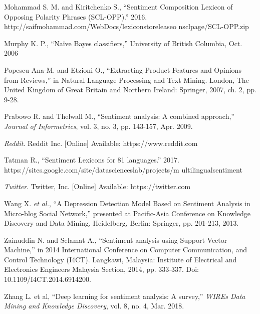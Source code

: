 \documentclass[12pt,journal,compsoc]{IEEEtran}
\begin{document}
\begin{thebibliography}{1}
  \bibitem{}
  Mohammad S. M. and Kiritchenko S., “Sentiment Composition Lexicon of Opposing Polarity Phrases (SCL-OPP).” 2016. http://saifmohammad.com/WebDocs/lexiconstoreleaseo \newline nsclpage/SCL-OPP.zip

  \bibitem{}
  Murphy K. P., “Naïve Bayes classifiers,” University of British Columbia, Oct. 2006

  \bibitem{}
  Popescu Ana-M. and Etzioni O., “Extracting Product Features and Opinions from Reviews,” in Natural Language Processing and Text Mining. London, The United Kingdom of Great Britain and Northern Ireland: Springer, 2007, ch. 2, pp. 9-28.

  \bibitem{}
  Prabowo R. and Thelwall M., “Sentiment analysis: A combined approach,” \emph{Journal of Informetrics}, vol. 3, no. 3, pp. 143-157, Apr. 2009.

  \bibitem{}
  \emph{Reddit}. Reddit Inc. [Online] Available: https://www.reddit.com

  \bibitem{}
  Tatman R., “Sentiment Lexicons for 81 languages.” 2017. https://sites.google.com/site/datascienceslab/projects/m \newline ultilingualsentiment

  \bibitem{}
  \emph{Twitter}. Twitter, Inc. [Online] Available: https://twitter.com

  \bibitem{}
  Wang X. \emph{et al.}, “A Depression Detection Model Based on Sentiment Analysis in Micro-blog Social Network,” presented at Pacific-Asia Conference on Knowledge Discovery and Data Mining, Heidelberg, Berlin: Springer, pp. 201-213, 2013.

  \bibitem{}
  Zainuddin N. and Selamat A., “Sentiment analysis using Support Vector Machine,” in 2014 International Conference on Computer Communication, and Control Technology (I4CT). Langkawi, Malaysia: Institute of Electrical and Electronics Engineers Malaysia Section, 2014, pp. 333-337. Doi: 10.1109/I4CT.2014.6914200.

  \bibitem{}
  Zhang L. et al, “Deep learning for sentiment analysis: A survey,” \emph{WIREs Data Mining and Knowledge Discovery}, vol. 8, no. 4, Mar. 2018.
\end{thebibliography}
\end{document}
